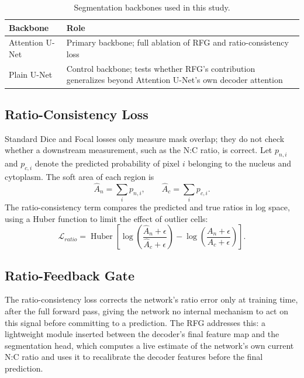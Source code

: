 \documentclass[pdflatex,sn-mathphys-num]{sn-jnl}%
\theoremstyle{thmstyleone}%
\theoremstyle{thmstyletwo}%
\theoremstyle{thmstylethree}%
\begin{document}
\begin{table}[t]
\caption{Segmentation backbones used in this study.}
\label{tab:models}
\centering
\begin{tabular}{p{2.3cm}p{5.0cm}}
\toprule
Backbone & Role \\
\midrule
Attention U-Net & Primary backbone; full ablation of RFG and ratio-consistency loss \\
Plain U-Net & Control backbone; tests whether RFG's contribution generalizes beyond Attention U-Net's own decoder attention \\
\bottomrule
\end{tabular}
\end{table}
 
\subsection{Ratio-Consistency Loss}
\label{sec:ratioloss}
 
Standard Dice and Focal losses only measure mask overlap; they do not check whether a downstream measurement, such as the N:C ratio, is correct. Let $p_{n,i}$ and $p_{c,i}$ denote the predicted probability of pixel $i$ belonging to the nucleus and cytoplasm. The soft area of each region is
\begin{equation}
\hat{A}_n=\sum_i p_{n,i}, \qquad \hat{A}_c=\sum_i p_{c,i}.
\label{eq:softarea}
\end{equation}
The ratio-consistency term compares the predicted and true ratios in log space, using a Huber function to limit the effect of outlier cells:
\begin{equation}
\mathcal{L}_{ratio}=\operatorname{Huber}\!\left[
\log\!\left(\frac{\hat{A}_n+\epsilon}{\hat{A}_c+\epsilon}\right)-
\log\!\left(\frac{A_n+\epsilon}{A_c+\epsilon}\right)
\right].
\label{eq:ratioloss}
\end{equation}
 
\subsection{Ratio-Feedback Gate}
\label{sec:rfg}
 
The ratio-consistency loss corrects the network's ratio error only at training time, after the full forward pass, giving the network no internal mechanism to act on this signal before committing to a prediction. The RFG addresses this: a lightweight module inserted between the decoder's final feature map and the segmentation head, which computes a live estimate of the network's own current N:C ratio and uses it to recalibrate the decoder features before the final prediction.
 
\end{document}

